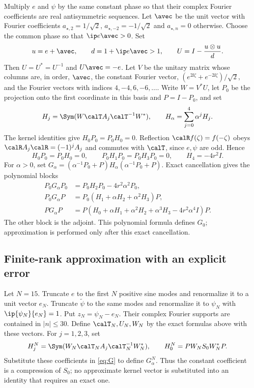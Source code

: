 Multiply $e$ and $\psi$ by the same constant phase so that their complex Fourier coefficients are real antisymmetric sequences. Let $\avec$ be the unit vector with Fourier coefficients $a_{\star,2}=1/\sqrt2$, $a_{\star,-2}=-1/\sqrt2$ and $a_{\star,n}=0$ otherwise. Choose the common phase so that $\ip e{\avec}>0$. Set
\begin{equation}\label{eq:householder}
 u=e+\avec,\qquad d=1+\ip e{\avec}>1,\qquad U=I-\frac{u\otimes u}{d}.
\end{equation}
Then $U=U^*=U^{-1}$ and $U\avec=-e$. Let $V$ be the unitary matrix whose columns are, in order, $\avec$, the constant Fourier vector, $(e^{2\ii\zeta}+e^{-2\ii\zeta})/\sqrt2$, and the Fourier vectors with indices $4,-4,6,-6,\ldots$. Write $W=V^*U$, let $P_0$ be the projection onto the first coordinate in this basis and $P=I-P_0$, and set
\[
 H_j=\Sym(W\calT A_j\calT^{-1}W^*),\qquad H_\alpha=\sum_{j=0}^4\alpha^jH_j.
\]
The kernel identities give $H_0P_0=P_0H_0=0$. Reflection $\calR f(\zeta)=f(-\zeta)$ obeys $\calR A_j\calR=(-1)^jA_j$ and commutes with $\calT$, since $e,\psi$ are odd. Hence
\begin{equation}\label{eq:exact-zeros}
 H_0P_0=P_0H_0=0,\qquad
 P_0H_1P_0=P_0H_3P_0=0,\qquad H_4=-4r^2I.
\end{equation}
For $\alpha>0$, set $G_\alpha=(\alpha^{-1}P_0+P)H_\alpha(\alpha^{-1}P_0+P)$. Exact cancellation gives the polynomial blocks
\begin{equation}\label{eq:G}
 \begin{aligned}
 P_0G_\alpha P_0&=P_0H_2P_0-4r^2\alpha^2P_0,\\
 P_0G_\alpha P&=P_0(H_1+\alpha H_2+\alpha^2H_3)P,\\
 PG_\alpha P&=P(H_0+\alpha H_1+\alpha^2H_2+\alpha^3H_3-4r^2\alpha^4I)P.
 \end{aligned}
\end{equation}
The other block is the adjoint. This polynomial formula defines $G_0$; approximation is performed only after this exact cancellation.



\subsection{Finite-rank approximation with an explicit error}
Let $N=15$. Truncate $e$ to the first $N$ positive sine modes and renormalize it to a unit vector $e_N$. Truncate $\widetilde\psi$ to the same modes and renormalize it to $\psi_N$ with $\ip{\psi_N}{e_N}=1$. Put $z_N=\psi_N-e_N$. Their complex Fourier supports are contained in $|n|\le30$. Define $\calT_N,U_N,W_N$ by the exact formulas above with these vectors. For $j=1,2,3$, set
\[
 H_j^N=\Sym(W_N\calT_N A_j\calT_N^{-1}W_N^*),\qquad
 H_0^N=PW_NS_0W_N^*P.
\]
Substitute these coefficients in \eqref{eq:G} to define $G_\alpha^N$. Thus the constant coefficient is a compression of $S_0$; no approximate kernel vector is substituted into an identity that requires an exact one.

